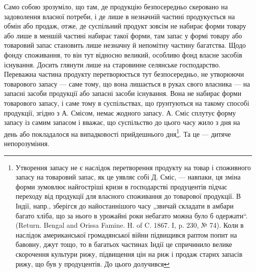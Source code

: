 Само собою зрозуміло, що там, де продукцію безпосередньо скеровано
на задоволення власної потреби, і де лише в незначній частині
продукується на обмін або продаж, отже, де суспільний продукт зовсім
не набирає форми товару або лише в меншій частині набирає такої форми,
там запас у формі товару або товаровий запас становить лише незначну
й непомітну частину багатства. Щодо фонду споживання, то він
тут відносно великий, особливо фонд власне засобів існування. Досить
глянути лише на старовинне селянське господарство. Переважна частина продукту
перетворюється тут безпосередньо, не утворюючи товарового запасу
— саме тому, що вона лишається в руках свого власника — на запасні
засоби продукції або запасні засоби існування. Вона не набирає форми
товарового запасу, і саме тому в суспільствах, що ґрунтуються на такому
способі продукції, згідно з А. Смісом, немає жодного запасу. А. Сміс
сплутує форму запасу із самим запасом і вважає, що суспільство до
цього часу жило з дня на день або покладалося на випадковості прийдешнього
дня\footnote{
Утворення запасу не є наслідок перетворення продукту на товар і споживного запасу на товаровий
запас, як це уявляє собі Д. Сміс, — навпаки,
ця зміна форми зумовлює найгостріші кризи в господарстві продуцентів підчас
переходу від продукції для власного споживання до товарової продукції. В Індії,
напр., зберігся до найостаннішого часу „звичай складати в амбари багато хліба, що
за нього в урожайні роки небагато можна було б одержати“. (Return. Bengal and
Orissa Famine. H. of C. 1867. I, p. 230, № 74). Коли в наслідок американської
громадянської війни підвищився раптом попит на бавовну, джут тощо, то в багатьох
частинах Індії це спричинило велике скорочення культури рижу, підвищення цін
на риж і продаж старих запасів рижу, що був у продуцентів. До цього долучився
}. Та це — дитяче непорозуміння.
